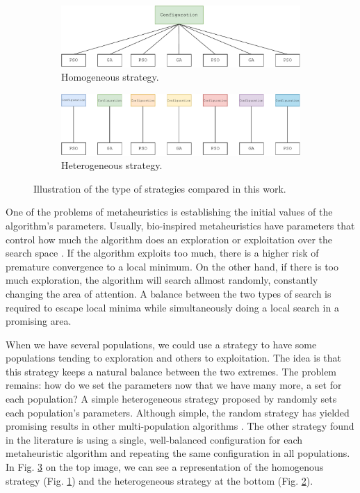 \documentclass[runningheads]{llncs}
\begin{document}
\begin{figure}[ht]
  \centering
  \begin{subfigure}{0.8\textwidth}
    \includegraphics[angle=0,width=1\textwidth]{homogeneo}
    \caption{Homogeneous strategy.}
    \label{fig:s_homogeneo} 
  \end{subfigure}

  \begin{subfigure}{0.8\textwidth}
     \includegraphics[angle=0,width=1\textwidth]{heterogeneo}
     \caption{Heterogeneous strategy.}
     \label{fig:s_heterogeneo} 
  \end{subfigure}
\caption{ Illustration of the type of strategies compared in this work.}
\label{fig:s_strategies}
\end{figure}

One of the problems of metaheuristics is establishing the initial values of the
algorithm's parameters. Usually, bio-inspired metaheuristics have parameters
that control how much the algorithm does an exploration or exploitation over
the search space \cite{yang2013swarm}. If the algorithm exploits too much, there is a higher risk of
premature convergence to a local minimum. On the other hand, if there is too
much exploration, the algorithm will search allmost randomly, constantly
changing the area of attention. A balance between the two types of search is
required to escape local minima while simultaneously doing a local search in a
promising area.

When we have several populations, we could use a strategy to
have some populations tending to exploration and others to exploitation. The
idea is that this strategy keeps a natural balance between the two extremes.
The problem remains: how do we set the parameters now that we have many more, a
set for each population? A simple heterogeneous strategy proposed by \cite{gong2011distributed} 
randomly sets each population's parameters. Although simple, the random
strategy has yielded promising results in other multi-population algorithms .
The other strategy found in the literature is using a single, well-balanced
configuration for each metaheuristic algorithm and repeating the same
configuration in all populations. In Fig. \ref{fig:s_strategies} on the top
image, we can see a representation of the homogenous strategy (Fig.
\ref{fig:s_homogeneo}) and the heterogeneous strategy at the bottom (Fig.
\ref{fig:s_heterogeneo}).
\end{document}
